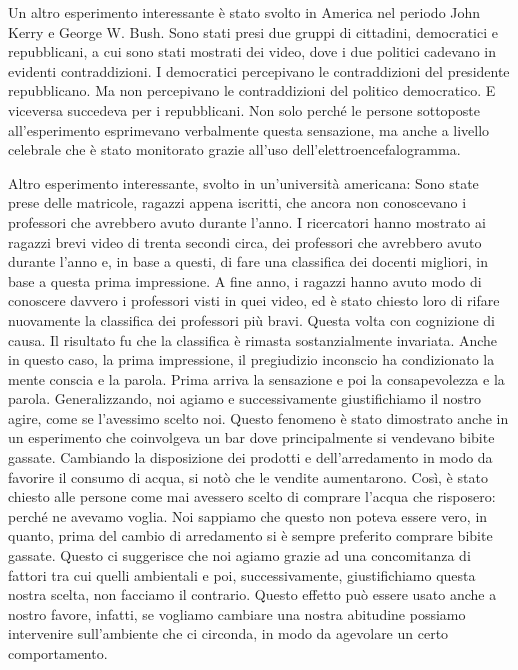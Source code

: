 \documentclass[12pt]{book} %
\begin{document}
Un altro esperimento interessante è stato svolto in America nel periodo John Kerry e George W. Bush. Sono stati presi
due gruppi di cittadini, democratici e repubblicani, a cui sono stati mostrati dei video, dove i due politici cadevano
in evidenti contraddizioni. I democratici percepivano le contraddizioni del presidente repubblicano. Ma non percepivano
le contraddizioni del politico democratico. E viceversa succedeva per i repubblicani. Non solo perché le persone
sottoposte all'esperimento esprimevano verbalmente questa sensazione, ma anche a livello celebrale
che è stato monitorato grazie all'uso dell'elettroencefalogramma.

Altro esperimento interessante, svolto in un'università americana: Sono state prese delle
matricole, ragazzi appena iscritti, che ancora non conoscevano i professori che avrebbero avuto durante
l'anno. I ricercatori hanno mostrato ai ragazzi brevi video di trenta secondi circa, dei
professori che avrebbero avuto durante l'anno e, in base a questi, di fare una classifica dei
docenti migliori, in base a questa prima impressione. A fine anno, i ragazzi hanno avuto modo di conoscere davvero i
professori visti in quei video, ed è stato chiesto loro di rifare nuovamente la classifica dei professori più bravi.
Questa volta con cognizione di causa. Il risultato fu che la classifica è rimasta sostanzialmente invariata. Anche in
questo caso, la prima impressione, il pregiudizio inconscio ha condizionato la mente conscia e la parola. Prima arriva
la sensazione e poi la consapevolezza e la parola.
Generalizzando, noi agiamo e successivamente giustifichiamo il nostro agire, come se l'avessimo
scelto noi. Questo fenomeno è stato dimostrato anche in un esperimento che coinvolgeva un bar dove principalmente si
vendevano bibite gassate. Cambiando la disposizione dei prodotti e dell'arredamento in modo da
favorire il consumo di acqua, si notò che le vendite aumentarono. Così, è stato chiesto alle persone come mai avessero
scelto di comprare l'acqua che risposero: perché ne avevamo voglia. Noi sappiamo che questo non
poteva essere vero, in quanto, prima del cambio di arredamento si è sempre preferito comprare bibite gassate. Questo ci
suggerisce che noi agiamo grazie ad una concomitanza di fattori tra cui quelli ambientali e poi, successivamente,
giustifichiamo questa nostra scelta, non facciamo il contrario. Questo effetto può essere usato anche a nostro favore,
infatti, se vogliamo cambiare una nostra abitudine possiamo intervenire sull'ambiente che ci
circonda, in modo da agevolare un certo comportamento.
\end{document}
